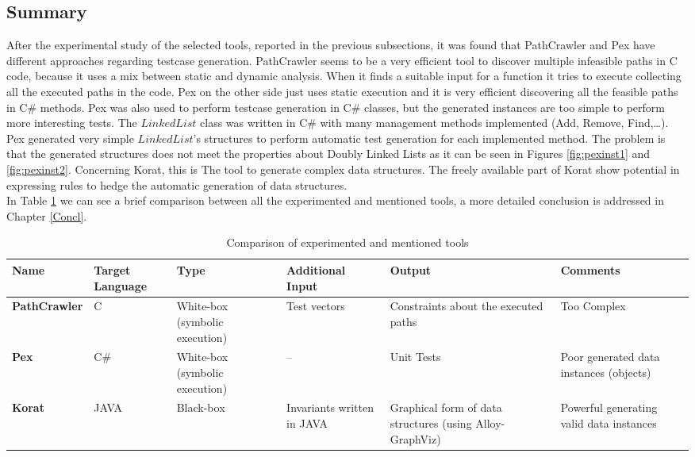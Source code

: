\begin{code}
\section{Summary}
After the experimental study of the selected tools, reported in the previous subsections, it was found that PathCrawler and Pex have different
approaches regarding testcase generation. PathCrawler seems to be a very efficient tool to discover multiple
infeasible paths in C code, because it uses a mix between static and dynamic analysis. When it finds a suitable input for a function it tries to execute
collecting all the executed paths in the code.
Pex on the other side just uses static execution and it is very efficient discovering all the feasible paths in C\# methods. Pex was also used
to perform testcase generation in C\# classes, but the generated instances are too simple to perform more interesting tests. The $LinkedList$ class was written
in C\# with many management methods implemented (Add, Remove, Find,\ldots). Pex generated very simple $LinkedList$'s structures to perform automatic test generation
for each implemented method. The problem is that the generated structures does not meet the properties about Doubly Linked Lists as it can be seen in Figures \ref{fig:pexinst1} and \ref{fig:pexinst2}.
Concerning Korat, this is The tool to generate complex data structures. The freely available part of Korat show potential in expressing rules to hedge
the automatic generation of data structures.\\
In Table \ref{tab:tabcmp} we can see a brief comparison between all the experimented and mentioned tools, a more detailed conclusion is addressed in Chapter \ref{Concl}.

\begin{table}[!ht]
\centering
\begin{tabular}{|m{2.5cm}|m{1cm}|m{2cm}|m{2cm}|m{3.5cm}|m{3.5cm}|}\hline
\textbf{Name} & \textbf{Target Language} & \textbf{Type} & \textbf{Additional Input} & \textbf{Output} & \textbf{Comments}\\\hline
\textbf{PathCrawler} & C & White-box (symbolic execution) & Test vectors & Constraints about the executed paths & Too Complex\\\hline
\textbf{Pex} & C\# & White-box (symbolic execution) & -- & Unit Tests & Poor generated data instances (objects)\\\hline
\textbf{Korat} & JAVA & Black-box & Invariants written in JAVA & Graphical form of data structures (using Alloy-GraphViz) & Powerful generating valid data instances\\\hline
\end{tabular}
\caption{Comparison of experimented and mentioned tools}
\label{tab:tabcmp}
\end{table}


\end{code}
